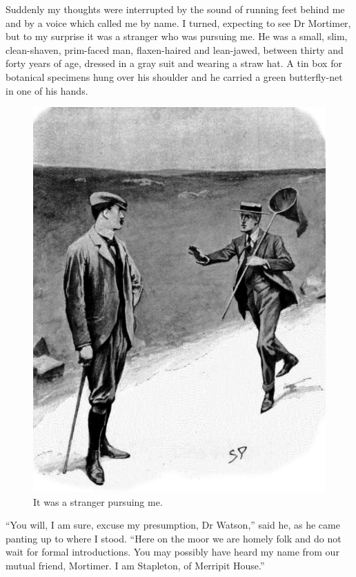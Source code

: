 \documentclass[paper=5.5in:8.5in,BCOR=7mm,twoside,DIV=calc,12pt,usegeometry,openany,chapterprefix,endperiod]{scrbook} %
\begin{document}
Suddenly my thoughts were interrupted by the sound of running feet behind me and by a voice which called me by name. I turned, expecting to see Dr Mortimer, but to my surprise it was a stranger who was pursuing me. He was a small, slim, clean-shaven, prim-faced man, flaxen-haired and lean-jawed, between thirty and forty years of age, dressed in a gray suit and wearing a straw hat. A tin box for botanical specimens hung over his shoulder and he carried a green butterfly-net in one of his hands.

\begin{figure}[tbhp]
\centering
\includegraphics[width=\linewidth]{07_stranger}
\caption{It was a stranger pursuing me.}
\end{figure}

\enquote{You will, I am sure, excuse my presumption, Dr Watson,} said he, as he came panting up to where I stood. \enquote{Here on the moor we are homely folk and do not wait for formal introductions. You may possibly have heard my name from our mutual friend, Mortimer. I am Stapleton, of Merripit House.}
\end{document}

